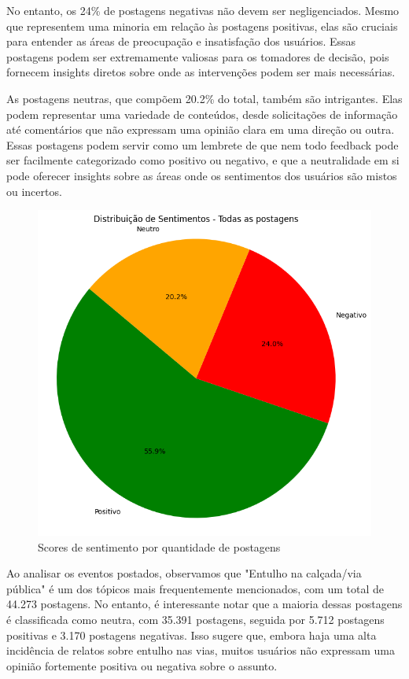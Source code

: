 No entanto, os 24\% de postagens negativas não devem ser negligenciados. Mesmo que representem uma minoria em relação às postagens positivas, elas são cruciais para entender as áreas de preocupação e insatisfação dos usuários. Essas postagens podem ser extremamente valiosas para os tomadores de decisão, pois fornecem insights diretos sobre onde as intervenções podem ser mais necessárias.

As postagens neutras, que compõem 20.2\% do total, também são intrigantes. Elas podem representar uma variedade de conteúdos, desde solicitações de informação até comentários que não expressam uma opinião clara em uma direção ou outra. Essas postagens podem servir como um lembrete de que nem todo feedback pode ser facilmente categorizado como positivo ou negativo, e que a neutralidade em si pode oferecer insights sobre as áreas onde os sentimentos dos usuários são mistos ou incertos.

\begin{figure}[!htb]
	\caption{Scores de sentimento por quantidade de postagens}
	\label{fig:pie_sentiment_breakdown}
	\centering
	\includegraphics[scale=0.9]{images/pie_sentiment_breakdown.png}
	\fautor
\end{figure}

Ao analisar os eventos postados, observamos que "Entulho na calçada/via pública" é um dos tópicos mais frequentemente mencionados, com um total de 44.273 postagens. No entanto, é interessante notar que a maioria dessas postagens é classificada como neutra, com 35.391 postagens, seguida por 5.712 postagens positivas e 3.170 postagens negativas. Isso sugere que, embora haja uma alta incidência de relatos sobre entulho nas vias, muitos usuários não expressam uma opinião fortemente positiva ou negativa sobre o assunto.

